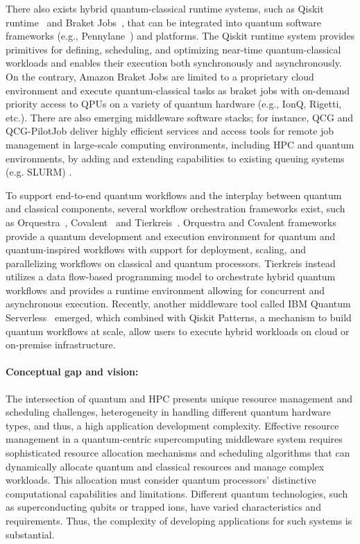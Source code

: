 There also exists hybrid quantum-classical runtime systems, such as Qiskit runtime~\cite{cross2018ibm} and Braket Jobs~\cite{braket-jobs-2021}, that can be integrated into quantum software frameworks (e.g., Pennylane~\cite{bergholm2018pennylane})  and platforms. The Qiskit runtime system provides primitives for defining, scheduling, and optimizing near-time quantum-classical workloads and enables their execution both synchronously and asynchronously. On the contrary, Amazon Braket Jobs are limited to a proprietary cloud environment and execute quantum-classical tasks as braket jobs with on-demand priority access to QPUs on a variety of quantum hardware (e.g., IonQ, Rigetti, etc.). There are also emerging middleware software stacks; for instance, QCG and QCG-PilotJob deliver highly efficient services and access tools for remote job management in large-scale computing environments, including HPC and quantum environments, by adding and extending capabilities to existing queuing systems (e.g. SLURM) \cite{qcg_quantum} \cite{qcg_vvuq}.


To support end-to-end quantum workflows and the interplay between quantum and classical components, several workflow orchestration frameworks exist, such as Orquestra~\cite{zapata2021orchestra}, Covalent~\cite{covalent2023} and Tierkreis~\cite{https://doi.org/10.48550/arxiv.2211.02350}. Orquestra and Covalent frameworks provide a quantum development and execution environment for quantum and quantum-inspired workflows with support for deployment, scaling, and parallelizing workflows on classical and quantum processors. Tierkreis instead utilizes a data flow-based programming model to orchestrate hybrid quantum workflows and provides a runtime environment allowing for concurrent and asynchronous execution. Recently, another middleware tool called IBM Quantum Serverless~\cite{quantum_serverless_qsw} emerged, which combined with Qiskit Patterns, a mechanism to build quantum workflows at scale, allow users to execute hybrid workloads on cloud or on-premise infrastructure.  

\paragraph{\bf Conceptual gap and vision:}


The intersection of quantum and HPC presents unique resource management and scheduling challenges, heterogeneity in handling different quantum hardware types, and thus, a high application development complexity. Effective resource management in a quantum-centric supercomputing middleware system requires sophisticated resource allocation mechanisms and scheduling algorithms that can dynamically allocate quantum and classical resources and manage complex workloads. This allocation must consider quantum processors' distinctive computational capabilities and limitations. Different quantum technologies, such as superconducting qubits or trapped ions, have varied characteristics and requirements. Thus, the complexity of developing applications for such systems is substantial.


